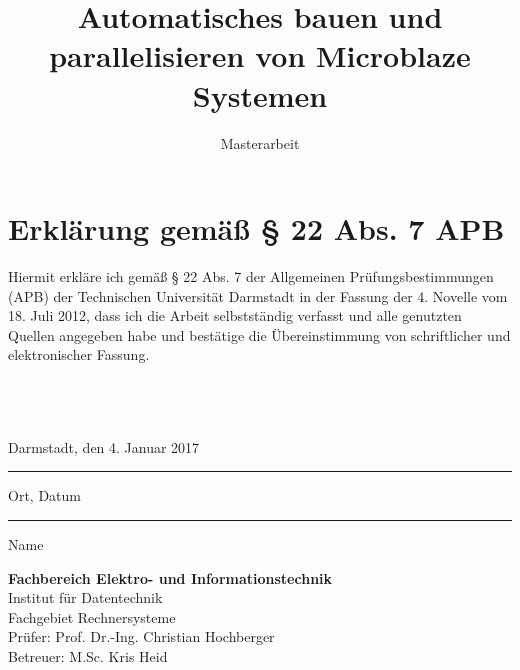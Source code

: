 \documentclass[accentcolor=tud1c,colorback,ngerman,12pt] {tudreport}
\begin{document}
\title{Automatisches bauen und parallelisieren von Microblaze Systemen}
\subtitle{Masterarbeit}

\maketitle
\chapter*{Erklärung gemäß § 22 Abs. 7 APB}

Hiermit erkläre ich gemäß § 22 Abs. 7 der Allgemeinen Prüfungsbestimmungen (APB) der Technischen Universität Darmstadt in der Fassung der 4. Novelle vom 18. Juli 2012, dass ich die Arbeit selbstständig verfasst und alle genutzten Quellen angegeben habe und bestätige die Übereinstimmung von schriftlicher und elektronischer Fassung.\\ \\ \\ \\

\parbox{8cm}{\centering Darmstadt, den 4. Januar 2017\hrule
\strut \centering\footnotesize Ort, Datum} \hfill\parbox{8cm}{\phantom{Darmstadt, den 4. Januar 2017} \hrule
\strut \centering\footnotesize Name}

\vfill

\noindent \textbf{Fachbereich Elektro- und Informationstechnik}\\
Institut für Datentechnik\\
Fachgebiet Rechnersysteme\\
Prüfer: Prof. Dr.-Ing. Christian Hochberger\\
Betreuer: M.Sc. Kris Heid

\tableofcontents








\end{document}

